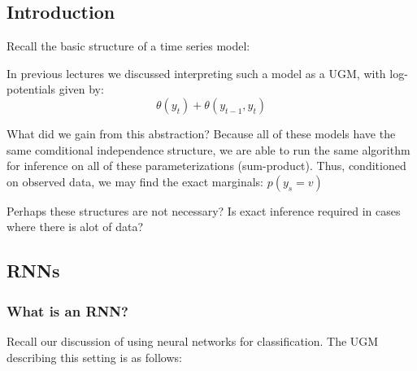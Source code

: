 \documentclass{article}
\begin{document}

\subsection{Introduction}
Recall the basic structure of a time series model:
\smallskip

\begin{center}
\end{center}

In previous lectures we discussed interpreting such a model as a UGM, with log-potentials given by:
$$\theta(y_{t}) + \theta(y_{t-1},y_{t})$$

What did we gain from this abstraction? Because all of these models have the same comditional independence structure, we are able to run the same algorithm for inference on all of these parameterizations (sum-product). Thus, conditioned on observed data, we may find the exact marginals: $p(y_{s}=v)$
\smallskip

Perhaps these structures are not necessary? Is exact inference required in cases where there is alot of data?

\subsection{RNNs}
\subsubsection{What is an RNN?}
Recall our discussion of using neural networks for classification. The UGM describing this setting is as follows:

\begin{center}
\end{center}
\end{document}
